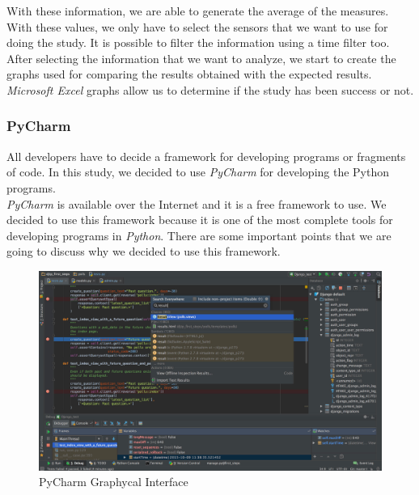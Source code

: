 With these information, we are able to generate the average of the measures. With these values, we only have to select the sensors that we want to use for doing the study. It is possible to filter the information using a time filter too.\\

After selecting the information that we want to analyze, we start to create the graphs used for comparing the results obtained with the expected results.\\

\textit{Microsoft Excel} graphs allow us to determine if the study has been success or not.

\subsubsection{PyCharm}

All developers have to decide a framework for developing programs or fragments of code. In this study, we decided to use \textit{PyCharm} for developing the Python programs.\\

\textit{PyCharm} is available over the Internet and it is a free framework to use. We decided to use this framework because it is one of the most complete tools for developing programs in \textit{Python}. There are some important points that we are going to discuss why we decided to use this framework.

\begin{figure}[H]
\begin{centering}
\includegraphics[scale=0.15]{IMGS/PYCHARM.jpg}
\caption{PyCharm Graphycal Interface \label{PYCHARM}}
\end{centering}
\end{figure}

